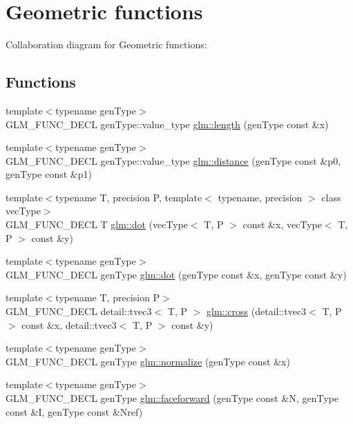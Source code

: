\hypertarget{group__core__func__geometric}{
\section{Geometric functions}
\label{group__core__func__geometric}
}


Collaboration diagram for Geometric functions:\subsection*{Functions}
\begin{CompactItemize}
\item 
{\footnotesize template$<$typename genType$>$ }\\GLM\_\-FUNC\_\-DECL genType::value\_\-type \hyperlink{group__core__func__geometric_gd73a94d9c967e619e670156356e93b7e}{glm::length} (genType const \&x)
\item 
{\footnotesize template$<$typename genType$>$ }\\GLM\_\-FUNC\_\-DECL genType::value\_\-type \hyperlink{group__core__func__geometric_gd21e00cab9f8b4eb6d1214a16dee06c7}{glm::distance} (genType const \&p0, genType const \&p1)
\item 
{\footnotesize template$<$typename T, precision P, template$<$ typename, precision $>$ class vecType$>$ }\\GLM\_\-FUNC\_\-DECL T \hyperlink{group__core__func__geometric_gc64a3b29d01336161a668d328cac97eb}{glm::dot} (vecType$<$ T, P $>$ const \&x, vecType$<$ T, P $>$ const \&y)
\item 
{\footnotesize template$<$typename genType$>$ }\\GLM\_\-FUNC\_\-DECL genType \hyperlink{group__core__func__geometric_g93acafc6005a3433ccf1dc3fa4230d51}{glm::dot} (genType const \&x, genType const \&y)
\item 
{\footnotesize template$<$typename T, precision P$>$ }\\GLM\_\-FUNC\_\-DECL detail::tvec3$<$ T, P $>$ \hyperlink{group__core__func__geometric_g9a325364ff3650c4a85c33704c646e76}{glm::cross} (detail::tvec3$<$ T, P $>$ const \&x, detail::tvec3$<$ T, P $>$ const \&y)
\item 
{\footnotesize template$<$typename genType$>$ }\\GLM\_\-FUNC\_\-DECL genType \hyperlink{group__core__func__geometric_g0feb2bb89ee2743677ad2cb84544bd83}{glm::normalize} (genType const \&x)
\item 
{\footnotesize template$<$typename genType$>$ }\\GLM\_\-FUNC\_\-DECL genType \hyperlink{group__core__func__geometric_ga4cdf87f6fd660e7086776d9abb6cbae}{glm::faceforward} (genType const \&N, genType const \&I, genType const \&Nref)

\end{CompactItemize}
